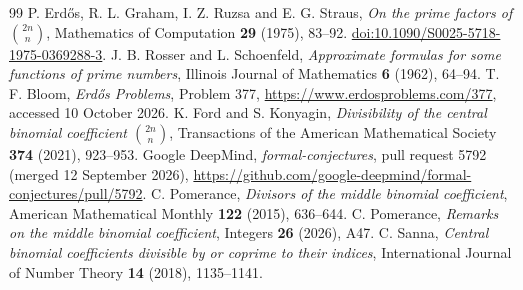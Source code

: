 \documentclass[10pt]{article}
\theoremstyle{remark}
\begin{document}
\begin{thebibliography}{99}
P. Erd\H{o}s, R. L. Graham, I. Z. Ruzsa and E. G. Straus,
\emph{On the prime factors of $\binom{2n}{n}$},
Mathematics of Computation \textbf{29} (1975), 83--92.
\href{https://doi.org/10.1090/S0025-5718-1975-0369288-3}
{doi:10.1090/S0025-5718-1975-0369288-3}.
J. B. Rosser and L. Schoenfeld,
\emph{Approximate formulas for some functions of prime numbers},
Illinois Journal of Mathematics \textbf{6} (1962), 64--94.
T. F. Bloom, \emph{Erd\H{o}s Problems}, Problem 377,
\url{https://www.erdosproblems.com/377}, accessed 10 October 2026.
K. Ford and S. Konyagin,
\emph{Divisibility of the central binomial coefficient $\binom{2n}{n}$},
Transactions of the American Mathematical Society \textbf{374} (2021), 923--953.
Google DeepMind, \emph{formal-conjectures}, pull request 5792 (merged
12 September 2026),
\url{https://github.com/google-deepmind/formal-conjectures/pull/5792}.
C. Pomerance, \emph{Divisors of the middle binomial coefficient},
American Mathematical Monthly \textbf{122} (2015), 636--644.
C. Pomerance, \emph{Remarks on the middle binomial coefficient},
Integers \textbf{26} (2026), A47.
C. Sanna, \emph{Central binomial coefficients divisible by or coprime to
their indices}, International Journal of Number Theory \textbf{14} (2018),
1135--1141.
\end{thebibliography}
\end{document}
